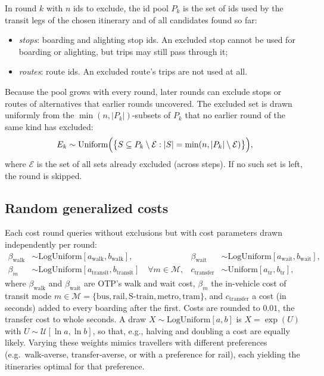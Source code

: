 \documentclass[11pt,a4paper]{article}
\begin{document}
In round $k$ with $n$ ids to exclude, the id pool $P_k$ is the set of ids used by the transit legs of
the chosen itinerary and of all candidates found so far:
\begin{itemize}
  \item \emph{stops}: boarding and alighting stop ids. An excluded stop cannot be used for boarding or
    alighting, but trips may still pass through it;
  \item \emph{routes}: route ids. An excluded route's trips are not used at all.
\end{itemize}
Because the pool grows with every round, later rounds can exclude stops or routes of alternatives
that earlier rounds uncovered. The excluded set is drawn uniformly from the $\min(n, |P_k|)$-subsets
of $P_k$ that no earlier round of the same kind has excluded:
\begin{equation}
  E_k \sim \text{Uniform} \Bigl(\bigl\{ S \subseteq P_k \setminus \mathcal{E}: |S| = \min(n,|P_k|\setminus \mathcal{E}) \bigr\} \Bigr),
\end{equation}
where $\mathcal{E}$ is the set of all sets already excluded (across steps). If no such set is left,
the round is skipped.


\subsection{Random generalized costs}

Each cost round queries without exclusions but with cost parameters drawn independently per round:
\begin{align}
  \beta_{\text{walk}} &\sim \text{LogUniform}[a_{\text{walk}}, b_{\text{walk}}], &
  \beta_{\text{wait}} &\sim \text{LogUniform}[a_{\text{wait}}, b_{\text{wait}}], \\
  \beta_{m} &\sim \text{LogUniform}[a_{\text{transit}}, b_{\text{transit}}] \quad \forall m \in \mathcal{M}, &
  c_{\text{transfer}} &\sim \text{Uniform}[a_{\text{tr}}, b_{\text{tr}}],
\end{align}
where $\beta_{\text{walk}}$ and $\beta_{\text{wait}}$ are OTP's walk and wait cost, $\beta_m$ the in-vehicle cost of transit mode $m \in \mathcal{M} = \{\text{bus}, \text{rail}, \text{S-train}, \text{metro}, \text{tram}\}$, and $c_{\text{transfer}}$ a cost (in seconds) added to every boarding after the first. Costs are rounded to $0.01$, the transfer cost to whole seconds.
A draw $X \sim \text{LogUniform}[a,b]$ is $X = \exp(U)$ with $U \sim \mathcal{U}[\ln a, \ln b]$, so that, e.g., halving and doubling a cost are equally likely. Varying these weights mimics travellers with different preferences (e.g.\ walk-averse, transfer-averse, or with a preference for rail), each yielding the itineraries optimal for that preference.
\end{document}

